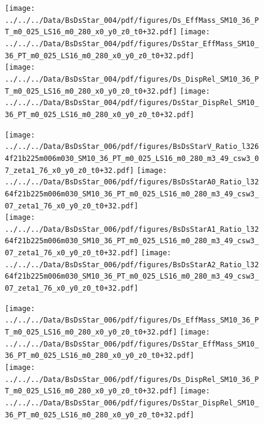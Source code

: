 \documentclass[a4paper,10pt]{article}
\begin{document}
\begin{figure}[p]
 \texttt{[image: ../../../Data/BsDsStar\_004/pdf/figures/Ds\_EffMass\_SM10\_36\_PT\_m0\_025\_LS16\_m0\_280\_x0\_y0\_z0\_t0+32.pdf]}  
\texttt{[image: ../../../Data/BsDsStar\_004/pdf/figures/DsStar\_EffMass\_SM10\_36\_PT\_m0\_025\_LS16\_m0\_280\_x0\_y0\_z0\_t0+32.pdf]} \\ 
\texttt{[image: ../../../Data/BsDsStar\_004/pdf/figures/Ds\_DispRel\_SM10\_36\_PT\_m0\_025\_LS16\_m0\_280\_x0\_y0\_z0\_t0+32.pdf]}  
\texttt{[image: ../../../Data/BsDsStar\_004/pdf/figures/DsStar\_DispRel\_SM10\_36\_PT\_m0\_025\_LS16\_m0\_280\_x0\_y0\_z0\_t0+32.pdf]} \\ 
\end{figure} 
\clearpage

\begin{figure}[p]
 \texttt{[image: ../../../Data/BsDsStar\_006/pdf/figures/BsDsStarV\_Ratio\_l3264f21b225m006m030\_SM10\_36\_PT\_m0\_025\_LS16\_m0\_280\_m3\_49\_csw3\_07\_zeta1\_76\_x0\_y0\_z0\_t0+32.pdf]}  
\texttt{[image: ../../../Data/BsDsStar\_006/pdf/figures/BsDsStarA0\_Ratio\_l3264f21b225m006m030\_SM10\_36\_PT\_m0\_025\_LS16\_m0\_280\_m3\_49\_csw3\_07\_zeta1\_76\_x0\_y0\_z0\_t0+32.pdf]} \\ 
\texttt{[image: ../../../Data/BsDsStar\_006/pdf/figures/BsDsStarA1\_Ratio\_l3264f21b225m006m030\_SM10\_36\_PT\_m0\_025\_LS16\_m0\_280\_m3\_49\_csw3\_07\_zeta1\_76\_x0\_y0\_z0\_t0+32.pdf]}  
\texttt{[image: ../../../Data/BsDsStar\_006/pdf/figures/BsDsStarA2\_Ratio\_l3264f21b225m006m030\_SM10\_36\_PT\_m0\_025\_LS16\_m0\_280\_m3\_49\_csw3\_07\_zeta1\_76\_x0\_y0\_z0\_t0+32.pdf]} \\ 
\end{figure} 
\clearpage

\begin{figure}[p]
 \texttt{[image: ../../../Data/BsDsStar\_006/pdf/figures/Ds\_EffMass\_SM10\_36\_PT\_m0\_025\_LS16\_m0\_280\_x0\_y0\_z0\_t0+32.pdf]}  
\texttt{[image: ../../../Data/BsDsStar\_006/pdf/figures/DsStar\_EffMass\_SM10\_36\_PT\_m0\_025\_LS16\_m0\_280\_x0\_y0\_z0\_t0+32.pdf]} \\ 
\texttt{[image: ../../../Data/BsDsStar\_006/pdf/figures/Ds\_DispRel\_SM10\_36\_PT\_m0\_025\_LS16\_m0\_280\_x0\_y0\_z0\_t0+32.pdf]}  
\texttt{[image: ../../../Data/BsDsStar\_006/pdf/figures/DsStar\_DispRel\_SM10\_36\_PT\_m0\_025\_LS16\_m0\_280\_x0\_y0\_z0\_t0+32.pdf]} \\ 
\end{figure} 
\clearpage
\end{document}
